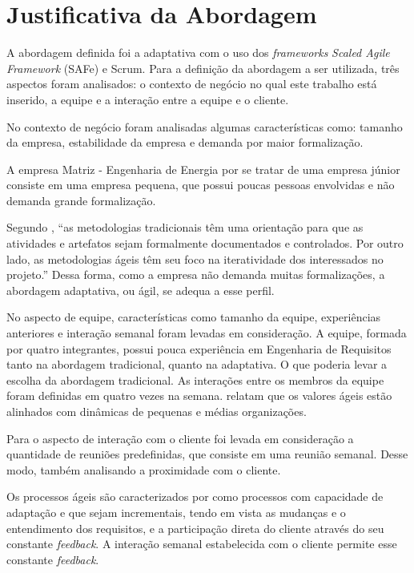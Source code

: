 \chapter[Justificativa]{Justificativa da Abordagem}



A abordagem definida foi a adaptativa com o uso dos \textit{frameworks} \emph{Scaled Agile Framework} (SAFe) e Scrum. 
Para a definição da abordagem a ser utilizada, 
três aspectos foram analisados: o contexto de negócio no qual este trabalho está inserido,
a equipe e a interação entre a equipe e o cliente.

No contexto de negócio foram analisadas algumas características como: tamanho da empresa,
estabilidade da empresa e demanda por maior formalização.

A empresa Matriz - Engenharia de Energia por se tratar de uma empresa júnior consiste
em uma empresa pequena, que possui poucas pessoas envolvidas e não demanda grande formalização.

Segundo , ``as metodologias tradicionais têm uma orientação
para que as atividades e artefatos sejam formalmente documentados e controlados. Por outro lado, as metodologias ágeis têm seu foco
na iteratividade dos interessados no projeto.'' Dessa forma, como a empresa não demanda muitas formalizações, a abordagem adaptativa, ou ágil,
se adequa a esse perfil.

No aspecto de equipe, características como tamanho da equipe, experiências anteriores e interação semanal 
foram levadas em consideração. A equipe, formada por quatro integrantes, possui pouca experiência 
em Engenharia de Requisitos tanto na abordagem tradicional, quanto na adaptativa. O que poderia
levar a escolha da abordagem tradicional.
As interações entre os membros da equipe foram definidas em quatro vezes na semana.
 relatam que os valores ágeis estão alinhados com dinâmicas de pequenas e médias organizações.

Para o aspecto de interação com o cliente foi levada em consideração a quantidade de
reuniões predefinidas, que consiste em uma reunião semanal. Desse modo, também analisando 
a proximidade com o cliente.

Os processos ágeis são caracterizados por  como processos
com capacidade de adaptação e que sejam incrementais, tendo em vista as
mudanças e o entendimento dos requisitos, e a participação direta do cliente através
do seu constante \textit{feedback}. A interação semanal estabelecida com o cliente permite esse constante
\textit{feedback}.


